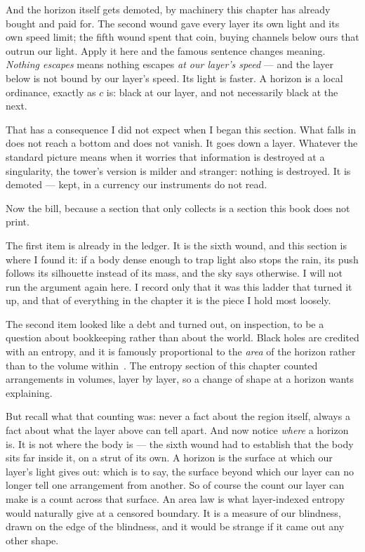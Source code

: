 \documentclass[fontsize=11pt,paper=a4,pagesize=auto,parskip=half-]{scrbook}
\begin{document}
And the horizon itself gets demoted, by machinery this chapter has already bought and paid for. The second wound gave every layer its own light and its own speed limit; the fifth wound spent that coin, buying channels below ours that outrun our light. Apply it here and the famous sentence changes meaning. \emph{Nothing escapes} means nothing escapes \emph{at our layer's speed} --- and the layer below is not bound by our layer's speed. Its light is faster. A horizon is a local ordinance, exactly as $c$ is: black at our layer, and not necessarily black at the next.

That has a consequence I did not expect when I began this section. What falls in does not reach a bottom and does not vanish. It goes down a layer. Whatever the standard picture means when it worries that information is destroyed at a singularity, the tower's version is milder and stranger: nothing is destroyed. It is demoted --- kept, in a currency our instruments do not read.

Now the bill, because a section that only collects is a section this book does not print.

The first item is already in the ledger. It is the sixth wound, and this section is where I found it: if a body dense enough to trap light also stops the rain, its push follows its silhouette instead of its mass, and the sky says otherwise. I will not run the argument again here. I record only that it was this ladder that turned it up, and that of everything in the chapter it is the piece I hold most loosely.

The second item looked like a debt and turned out, on inspection, to be a question about bookkeeping rather than about the world. Black holes are credited with an entropy, and it is famously proportional to the \emph{area} of the horizon rather than to the volume within~\cite{bekenstein1973}. The entropy section of this chapter counted arrangements in volumes, layer by layer, so a change of shape at a horizon wants explaining.

But recall what that counting was: never a fact about the region itself, always a fact about what the layer above can tell apart. And now notice \emph{where} a horizon is. It is not where the body is --- the sixth wound had to establish that the body sits far inside it, on a strut of its own. A horizon is the surface at which our layer's light gives out: which is to say, the surface beyond which our layer can no longer tell one arrangement from another. So of course the count our layer can make is a count across that surface. An area law is what layer-indexed entropy would naturally give at a censored boundary. It is a measure of our blindness, drawn on the edge of the blindness, and it would be strange if it came out any other shape.
\end{document}
